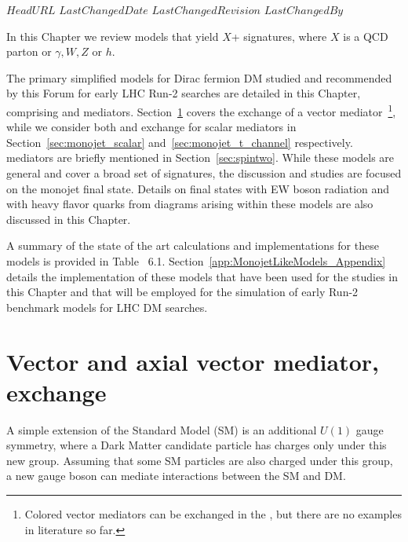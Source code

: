 \svnidlong
{$HeadURL$}
{$LastChangedDate$}
{$LastChangedRevision$}
{$LastChangedBy$}



In this Chapter we review 
models that yield $X$+\MET{} signatures,
where $X$ is a QCD parton or $\gamma, W, Z$ or $h$.

The primary simplified models for Dirac fermion DM studied and recommended by this Forum 
for early LHC Run-2 searches are detailed in this Chapter, 
comprising \spinzero and \spinone mediators. Section~\ref{sec:monojet_V} covers the
\schannel exchange of a vector mediator~\footnote{Colored vector mediators 
can be exchanged in the \tchannel, but there are no examples in literature so far.}, 
while we consider both \schannel and \tchannel exchange for scalar mediators in
Section~\ref{sec:monojet_scalar} and~\ref{sec:monojet_t_channel} respectively. 
\Spintwo mediators are briefly mentioned in Section~\ref{sec:spintwo}.
While these models are general and cover a broad set of signatures,
the discussion and studies are focused on the monojet final state. 
Details on final states with EW boson radiation and with heavy flavor quarks 
from diagrams arising within these models are also discussed in this Chapter.

A summary of the state of the art calculations and implementations for these models 
is provided in Table~%
6.1. Section~\ref{app:MonojetLikeModels_Appendix}
details the implementation of these models that
have been used for the studies in this Chapter and that will be employed
for the simulation of early Run-2 benchmark models for LHC DM searches. 


\section{Vector and axial vector mediator, \schannel exchange}
\label{sec:monojet_V}

A simple extension of the Standard Model (SM) is an
additional $U(1)$ gauge symmetry, where a Dark Matter
candidate particle has charges only under this new group.
Assuming that some SM particles are also charged under
this group, a new gauge boson can mediate interactions
between the SM and DM.   

